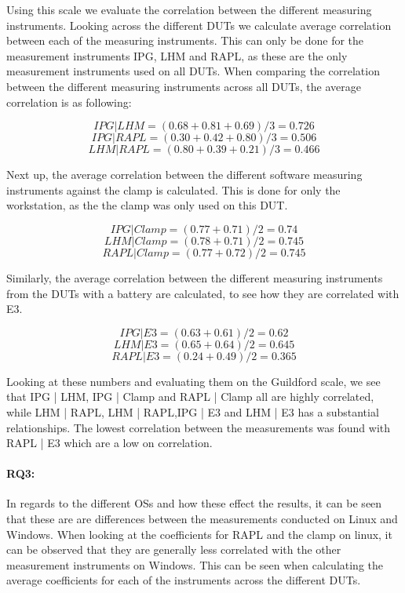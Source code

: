

Using this scale we evaluate the correlation between the different measuring instruments. Looking across the different DUTs we calculate average correlation between each of the measuring instruments. This can only be done for the measurement instruments IPG, LHM and RAPL, as these are the only measurement instruments used on all DUTs. When comparing the correlation between the different measuring instruments across all DUTs, the average correlation is as following:

$$IPG | LHM = (0.68+0.81+0.69)/3 = 0.726$$
$$IPG | RAPL = (0.30+0.42+0.80)/3 = 0.506$$
$$LHM | RAPL = (0.80+0.39+0.21)/3 = 0.466$$

Next up, the average correlation between the different software measuring instruments against the clamp is calculated. This is done for only the workstation, as the the clamp was only used on this DUT.

$$IPG | Clamp = (0.77+0.71)/2 = 0.74$$
$$LHM | Clamp = (0.78+0.71)/2 = 0.745$$
$$RAPL | Clamp = (0.77+0.72)/2 = 0.745$$

Similarly, the average correlation between the different measuring instruments from the DUTs with a battery are calculated, to see how they are correlated with E3.

$$IPG | E3 = (0.63+0.61)/2 = 0.62$$
$$LHM | E3 = (0.65+0.64)/2 = 0.645$$
$$RAPL | E3 = (0.24+0.49)/2 = 0.365$$

Looking at these numbers and evaluating them on the Guildford scale, we see that IPG | LHM, IPG | Clamp and RAPL | Clamp all are highly correlated, while LHM | RAPL, LHM | RAPL,IPG | E3 and LHM | E3 has a substantial relationships. The lowest correlation between the measurements was found with RAPL | E3 which are a low on correlation.

\paragraph{RQ3:} In regards to the different OSs and how these effect the results, it can be seen that these are are differences between the measurements conducted on Linux and Windows. When looking at the coefficients for RAPL and the clamp on linux, it can be observed that they are generally less correlated with the other measurement instruments on Windows. This can be seen when calculating the average coefficients for each of the instruments across the different DUTs.

